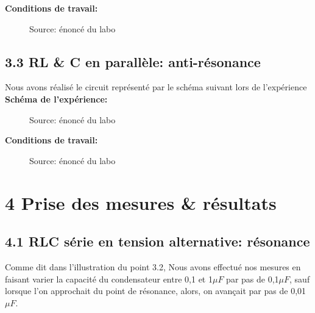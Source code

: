 \documentclass{report}
\begin{document}
\pagebreak

\textbf{Conditions de travail: }

\begin{figure}[h!]
\centering
\caption{Source: \'enonc\'e du labo}
\end{figure}

\subsection*{3.3 RL \& C en parall\`ele: anti-r\'esonance}

Nous avons r\'ealis\'e le circuit repr\'esent\'e par le sch\'ema suivant lors de l'exp\'erience \\

\textbf{Sch\'ema de l'exp\'erience: }
\begin{figure}[h!]
\centering
\caption{Source: \'enonc\'e du labo}
\end{figure}

\textbf{Conditions de travail: }
\begin{figure}[h!]
\centering
\caption{Source: \'enonc\'e du labo}
\end{figure}

\section*{4 Prise des mesures \& r\'esultats}

\subsection*{4.1 RLC s\'erie en tension alternative: r\'esonance}

\hspace*{0,5cm} Comme dit dans l'illustration du point 3.2, Nous avons effectu\'e nos mesures en faisant varier la capacit\'e du condensateur entre 0,1 et 1$\mu F$ par pas de 0,1$\mu F$, sauf lorsque l'on approchait du point de r\'esonance, alors, on avan\c cait par pas de 0,01$\mu F$.  \\
\end{document}
